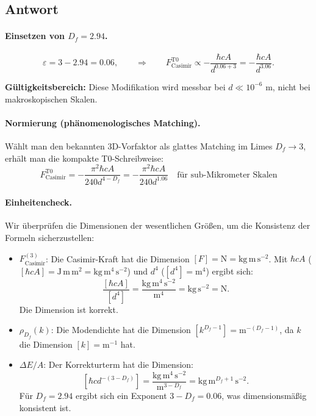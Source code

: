 \documentclass[12pt,a4paper]{article}
\theoremstyle{remark}
\newenvironment{answer}{\subsection*{Antwort}}{\vspace{1em}}
\begin{document}
\begin{answer}
	\paragraph{Einsetzen von \( D_f = 2.94 \).}
	\begin{equation}
		\varepsilon = 3 - 2.94 = 0.06, \qquad \Rightarrow \qquad F_{\text{Casimir}}^{\text{T0}} \propto -\frac{\hbar c A}{d^{0.06+3}} = -\frac{\hbar c A}{d^{3.06}}.
	\end{equation}
	
	\textbf{Gültigkeitsbereich:} Diese Modifikation wird messbar bei $d \ll 10^{-6}$ m, nicht bei makroskopischen Skalen.
	
	\paragraph{Normierung (phänomenologisches Matching).}
	Wählt man den bekannten 3D-Vorfaktor als glattes Matching im Limes \( D_f \to 3 \), erhält man die kompakte T0-Schreibweise:
	\begin{equation}
		F_{\text{Casimir}}^{\text{T0}} = -\frac{\pi^2 \hbar c A}{240 d^{4-D_f}} = -\frac{\pi^2 \hbar c A}{240 d^{1.06}} \quad \text{für sub-Mikrometer Skalen}
	\end{equation}
	
	\paragraph{Einheitencheck.}
	Wir überprüfen die Dimensionen der wesentlichen Größen, um die Konsistenz der Formeln sicherzustellen:
	\begin{itemize}
		\item \( F_{\text{Casimir}}^{(3)} \): Die Casimir-Kraft hat die Dimension \([F] = \text{N} = \text{kg} \, \text{m} \, \text{s}^{-2}\). Mit \(\hbar c A\) (\([\hbar c A] = \text{J} \, \text{m} \, \text{m}^2 = \text{kg} \, \text{m}^4 \, \text{s}^{-2}\)) und \(d^4\) (\([d^4] = \text{m}^4\)) ergibt sich:
		\[
		\frac{[\hbar c A]}{[d^4]} = \frac{\text{kg} \, \text{m}^4 \, \text{s}^{-2}}{\text{m}^4} = \text{kg} \, \text{s}^{-2} = \text{N}.
		\]
		Die Dimension ist korrekt.
		\item \( \rho_{D_f}(k) \): Die Modendichte hat die Dimension \([k^{D_f - 1}] = \text{m}^{-(D_f - 1)}\), da \( k \) die Dimension \([k] = \text{m}^{-1}\) hat.
		\item \( \Delta E / A \): Der Korrekturterm hat die Dimension:
		\[
		[\hbar c d^{-(3 - D_f)}] = \frac{\text{kg} \, \text{m}^4 \, \text{s}^{-2}}{\text{m}^{3 - D_f}} = \text{kg} \, \text{m}^{D_f + 1} \, \text{s}^{-2}.
		\]
		Für \( D_f = 2.94 \) ergibt sich ein Exponent \( 3 - D_f = 0.06 \), was dimensionsmäßig konsistent ist.
	\end{itemize}
	

\end{answer}
\end{document}
